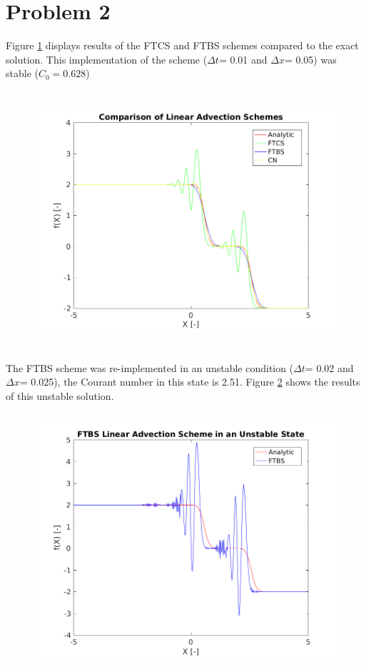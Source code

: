 \documentclass[12pt]{article}
\begin{document}
	

	

	
	
	
		
	\section{Problem 2}
	
	\noindent Figure \ref{fig:ftcs_ftbs} displays results of the FTCS and FTBS schemes compared to the exact solution. This implementation of the scheme ($\Delta t$= 0.01 and $\Delta x$= 0.05) was stable ($C_0=0.628$)
	
		\begin{figure}[H]
			\centering
			\includegraphics[height=3.75in]{ftcs_ftbs.png}
			\label{fig:ftcs_ftbs}
			\caption{}
		\end{figure}
		
	\noindent The FTBS scheme was re-implemented in an unstable condition ($\Delta t$= 0.02 and $\Delta x$= 0.025), the Courant number in this state is 2.51. Figure \ref{fig:ftbs_unstable} shows the results of this unstable solution.
	
	\begin{figure}[H]
		\centering
		\includegraphics[height=3.75in]{ftbs_unstable.png}
		\label{fig:ftbs_unstable}
		\caption{}
	\end{figure}
	
\end{document}

